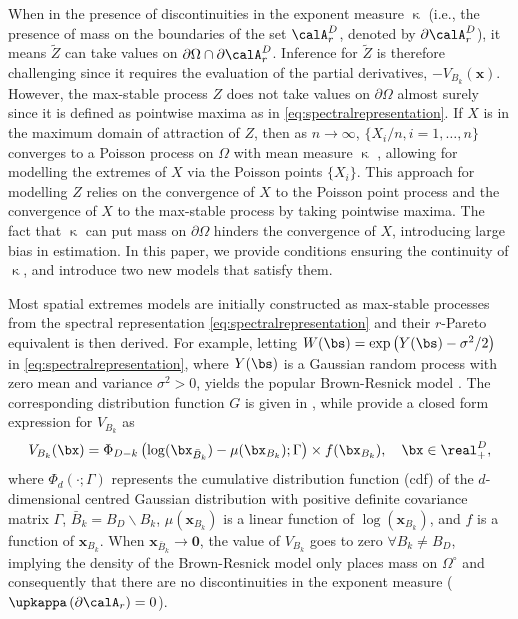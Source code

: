 \documentclass[12pt]{article}
\begin{document}
When in the presence of discontinuities in the exponent measure $\upkappa$ (i.e., the presence of mass on the boundaries of the set $\calA_r^D$, denoted by $\partial\calA_r^D$), it means $\tilde Z$ can take values on $\partial\Omega \cap \partial\calA_r^D$. Inference for $\tilde Z$ is therefore challenging since it requires the evaluation of the partial derivatives, $-V_{B_k}(\bm x)$. 
However, the max-stable process $Z$ does not take values on $\partial\Omega$ almost surely since it is defined as pointwise maxima as in \eqref{eq:spectralrepresentation}. If $X$ is in the maximum domain of attraction of $Z$, then as $n\to\infty$, $\{X_i/n,i=1,\dots,n\}$ converges to a Poisson process on $\Omega$ with mean measure $\upkappa$ \citep[Ch.~6]{Resnick:2006}, allowing for modelling the extremes of $X$ via the Poisson points $\{X_i\}$. This approach for modelling $Z$ relies on the convergence of $X$ to the Poisson point process and the convergence of $X$ to the max-stable process by taking pointwise maxima. The fact that $\upkappa$ can put mass on $\partial\Omega$ hinders the convergence of $X$, introducing large bias in estimation. In this paper, we provide conditions ensuring the continuity of $\upkappa$, and introduce two new models that satisfy them.


Most spatial extremes models are initially constructed as max-stable processes from the spectral representation \eqref{eq:spectralrepresentation} and their $r$-Pareto equivalent is then derived.
%
For example, letting $W(\bs)=\exp \left(Y(\bs) - \sigma^2/2\right)$ in \eqref{eq:spectralrepresentation}, where $Y(\bs)$ is a Gaussian random process with zero mean and variance $\sigma^2>0$, yields the popular Brown-Resnick model \citep{Brown.Resnick:1977, Kabluchko.etal:2009}. The corresponding distribution function $G$ is given in \citet{Huser.Davison:2013a}, while \cite{Wadsworth.Tawn:2014} provide a closed form expression for $V_{B_k}$ as
%
$$
V_{B_k}(\bx) = \Phi_{D-k}\left(\log(\bx_{\bar{B}_k}) - \mu(\bx_{B_k});\Gamma \right) \times f(\bx_{B_k}), \quad \bx \in \real_+^D,
$$
%
where $\Phi_d(\cdot; \Gamma)$ represents the cumulative distribution function (cdf) of the $d$-dimensional centred Gaussian distribution with positive definite covariance matrix $\Gamma$, $\bar{B}_k = B_D \backslash B_k$, $\mu(\bm x_{B_k})$ is a linear function of $\log(\bm x_{B_k})$, 
and $f$ is a function of $\bm x_{B_k}$. When $\bm x_{\bar{B}_k}\to \bm 0$, the value of $V_{B_k}$ goes to zero $\forall B_k\neq B_D$, implying the density of the Brown-Resnick model only places mass on $\Omega^\circ$ 
and consequently that there are no discontinuities in the exponent measure ($\upkappa\left( \partial \calA_r\right)=0$).
\end{document}
